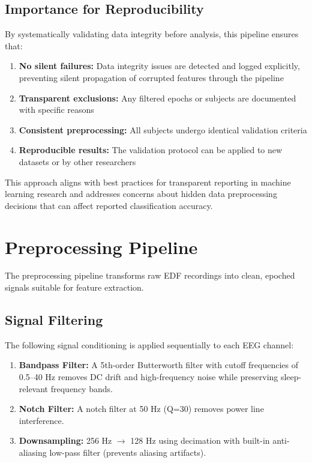 \documentclass{imc-inf} %
\begin{document}
\subsection{Importance for Reproducibility}

By systematically validating data integrity before analysis, this pipeline ensures that:

\begin{enumerate}
\item \textbf{No silent failures:} Data integrity issues are detected and 
      logged explicitly, preventing silent propagation of corrupted features through the pipeline
\item \textbf{Transparent exclusions:} Any filtered epochs or subjects are documented with specific reasons
\item \textbf{Consistent preprocessing:} All subjects undergo identical validation criteria
\item \textbf{Reproducible results:} The validation protocol can be applied to new datasets or by other researchers
\end{enumerate}

This approach aligns with best practices for transparent reporting in machine learning research and addresses concerns about hidden data preprocessing decisions that can affect reported classification accuracy.


\section{Preprocessing Pipeline}
\label{sec:preprocessing}

The preprocessing pipeline transforms raw EDF recordings into clean, epoched signals suitable for feature extraction.

\subsection{Signal Filtering}

The following signal conditioning is applied sequentially to each EEG channel:

\begin{enumerate}
\item \textbf{Bandpass Filter:} A 5th-order Butterworth filter with cutoff frequencies of 0.5--40 Hz removes DC drift and high-frequency noise while preserving sleep-relevant frequency bands.
\item \textbf{Notch Filter:} A notch filter at 50 Hz (Q=30) removes power line interference.
\item \textbf{Downsampling:} 256 Hz $\rightarrow$ 128 Hz using decimation with built-in anti-aliasing low-pass filter (prevents aliasing artifacts).
\end{enumerate}
\end{document}
